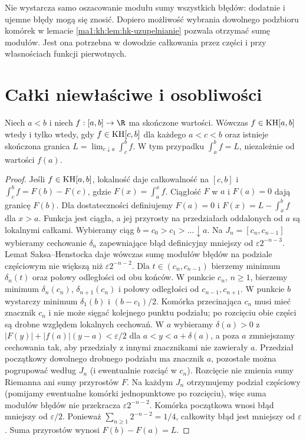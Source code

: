 \begin{uwaga}
Nie wystarcza samo oszacowanie modułu sumy wszystkich błędów: dodatnie i ujemne błędy mogą się znosić. Dopiero możliwość wybrania dowolnego podzbioru komórek w lemacie \ref{ma1:kh:lem:hk-uzupelnianie} pozwala otrzymać sumę modułów. Jest ona potrzebna w dowodzie całkowania przez części i przy własnościach funkcji pierwotnych.
\end{uwaga}

\section{Całki niewłaściwe i osobliwości}
\begin{twierdzenie}\label{ma1:kh:thm:kh-hake}\label{it:thm:kh-hake}
Niech $a<b$ i niech $f:[a,b]\to\R$ ma skończone wartości. Wówczas $f\in\mathrm{KH}[a,b]$ wtedy i tylko wtedy, gdy $f\in\mathrm{KH}[c,b]$ dla każdego $a<c<b$ oraz istnieje skończona granica $L=\lim_{c\downarrow a}\int_c^b f$. W tym przypadku $\int_a^b f=L$, niezależnie od wartości $f(a)$.
\end{twierdzenie}
\begin{proof}
Jeśli $f\in\mathrm{KH}[a,b]$, lokalność daje całkowalność na $[c,b]$ i $\int_c^b f=F(b)-F(c)$, gdzie $F(x)=\int_a^x f$. Ciągłość $F$ w $a$ i $F(a)=0$ dają granicę $F(b)$. Dla dostateczności definiujemy $F(a)=0$ i $F(x)=L-\int_x^b f$ dla $x>a$. Funkcja jest ciągła, a jej przyrosty na przedziałach oddalonych od $a$ są lokalnymi całkami. Wybieramy ciąg $b=c_0>c_1>\dots\downarrow a$. Na $J_n=[c_n,c_{n-1}]$ wybieramy cechowanie $\delta_n$ zapewniające błąd definicyjny mniejszy od $\varepsilon2^{-n-3}$. Lemat Saksa--Henstocka daje wówczas sumę modułów błędów na podziale częściowym nie większą niż $\varepsilon2^{-n-2}$. Dla $t\in(c_n,c_{n-1})$ bierzemy minimum $\delta_n(t)$ oraz połowy odległości od obu końców. W punkcie $c_n$, $n\ge1$, bierzemy minimum $\delta_n(c_n)$, $\delta_{n+1}(c_n)$ i połowy odległości od $c_{n-1},c_{n+1}$. W punkcie $b$ wystarczy minimum $\delta_1(b)$ i $(b-c_1)/2$. Komórka przecinająca $c_n$ musi mieć znacznik $c_n$ i nie może sięgać kolejnego punktu podziału; po rozcięciu obie części są drobne względem lokalnych cechowań. W $a$ wybieramy $\delta(a)>0$ z $|F(y)|+|f(a)|(y-a)<\varepsilon/2$ dla $a<y<a+\delta(a)$, a poza $a$ zmniejszamy cechowania tak, aby przedziały z innymi znacznikami nie zawierały $a$. Przedział początkowy dowolnego drobnego podziału ma znacznik $a$, pozostałe można pogrupować według $J_n$ (i ewentualnie rozciąć w $c_n$). Rozcięcie nie zmienia sumy Riemanna ani sumy przyrostów $F$. Na każdym $J_n$ otrzymujemy podział częściowy (pomijamy ewentualne komórki jednopunktowe po rozcięciu), więc suma modułów błędów nie przekracza $\varepsilon2^{-n-2}$. Komórka początkowa wnosi błąd mniejszy od $\varepsilon/2$. Ponieważ $\sum_{n\ge1}2^{-n-2}=1/4$, całkowity błąd jest mniejszy od $\varepsilon$. Suma przyrostów wynosi $F(b)-F(a)=L$.
\end{proof}
